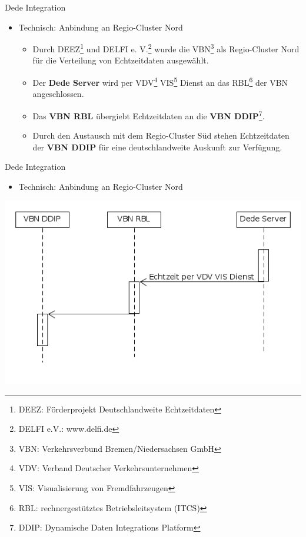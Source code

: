 \begin{frame}{Dede Integration}
  \begin{itemize}
  \item Technisch: Anbindung an Regio-Cluster Nord
    \begin{itemize}
    \item Durch DEEZ\footnote{DEEZ: Förderprojekt Deutschlandweite Echtzeitdaten} und DELFI e. V.\footnote{DELFI e.V.: www.delfi.de} wurde die VBN\footnote{VBN: Verkehrsverbund Bremen/Niedersachsen GmbH} als Regio-Cluster Nord für die Verteilung von Echtzeitdaten ausgewählt.
    \item Der \textbf{Dede Server} wird per VDV\footnote{VDV: Verband Deutscher Verkehrsunternehmen} VIS\footnote{VIS: Visualisierung von Fremdfahrzeugen} Dienst an das RBL\footnote{RBL: rechnergestütztes Betriebsleitsystem (ITCS)} der VBN angeschlossen.
    \item Das \textbf{VBN RBL} übergiebt Echtzeitdaten an die \textbf{VBN DDIP}\footnote{DDIP: Dynamische Daten Integrations Platform}.
      \item Durch den Austausch mit dem Regio-Cluster Süd stehen Echtzeitdaten der \textbf{VBN DDIP} für eine deutschlandweite Auskunft zur Verfügung.
    \end{itemize}
  \end{itemize}
\end{frame}

\begin{frame}{Dede Integration}
  \begin{itemize}
  \item Technisch: Anbindung an Regio-Cluster Nord
  \end{itemize}
  \includegraphics[width=0.75\paperwidth]{dede/dede-vbn-ddip}
\end{frame}

